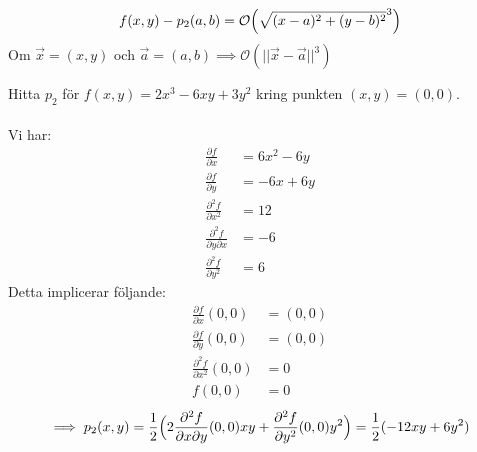 \documentclass{report}
\begin{document}

{
\begin{equation*}
	f(x,y) - p_2(a,b) = \mathcal{O} \Bigl( \sqrt{(x-a)^2+(y-b)^2}^3   \Bigr)
\end{equation*}
Om $ \vec{x} = (x,y) $ och $ \vec{a} = (a,b) \implies \mathcal{O}( || \vec{x} - \vec{a} ||^3 ) $ 
}

\ex{}
{
Hitta $ p_2 $ för $ f(x,y) = 2x^3-6xy+3y^2 $ kring punkten $ (x,y) = (0,0) $.\\\\

Vi har:
\begin{align*}
	\frac{\partial f }{\partial x } &= 6x^2-6y\\
	\frac{\partial f }{\partial y } &= -6x+6y\\
	\frac{\partial^2f }{\partial x^2 } &= 12\\
	\frac{\partial^2f }{\partial y \partial x } &= -6\\
	\frac{\partial^2 f }{\partial y^2 } &= 6
\end{align*}
Detta implicerar följande:
\begin{align*}
	\frac{\partial f }{\partial x } (0,0) &= (0,0)\\
	\frac{\partial f }{\partial y }(0,0) &= (0,0)\\
	\frac{\partial^2 f }{\partial x^2 }(0,0) &= 0\\
	f(0,0) &= 0
\end{align*}
\begin{equation*}
\implies p_2(x,y) = \frac{1}{2} \Bigl( 2 \frac{\partial^2 f }{\partial x \partial y } (0,0)xy + \frac{\partial^2 f }{\partial y^2 } (0,0)y^2  \Bigr) = \frac{1}{2} (-12xy + 6y^2)
\end{equation*}
}
\end{document}
